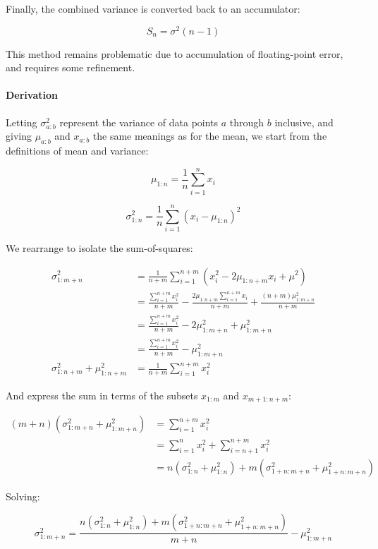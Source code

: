 \documentclass[a4paper]{article}
\begin{document}
Finally, the combined variance is converted back to an accumulator:

\[S_n = \sigma^2(n - 1)\]

This method remains problematic due to accumulation of floating-point
error, and requires some refinement.

\paragraph{Derivation}\label{derivation-1}

Letting \(\sigma_{a:b}^2\) represent the variance of data points \(a\)
through \(b\) inclusive, and giving \(\mu_{a:b}\) and \(x_{a:b}\) the
same meanings as for the mean, we start from the definitions of mean and
variance:

\[\mu_{1:n} = \frac{1}{n} \sum\limits_{i=1}^n x_i\]

\[\sigma_{1:n}^2 = \frac{1}{n} \sum\limits_{i=1}^n (x_i - \mu_{1:n})^2\]

We rearrange to isolate the sum-of-squares:

\[\begin{aligned}\sigma_{1:m+n}^2 &= \frac{1}{n+m} \sum\limits_{i=1}^{n+m} (x_i^2 - 2\mu_{1:n+m}x_i + \mu^2) \\
  &= \frac{\sum\limits_{i=1}^{n+m} x_i^2}{n+m} - \frac{2\mu_{1:n+m}\sum\limits_{i=1}^{n+m} x_i}{n+m} + \frac{(n + m)\mu_{1:m+n}^2}{n+m} \\
  &= \frac{\sum\limits_{i=1}^{n+m} x_i^2}{n+m} - 2\mu_{1:m+n}^2 + \mu_{1:m+n}^2 \\
  &= \frac{\sum\limits_{i=1}^{n+m} x_i^2}{n+m} - \mu_{1:m+n}^2 \\
  \sigma_{1:n+m}^2 + \mu_{1:n+m}^2 &= \frac{1}{n+m} \sum\limits_{i=1}^{n+m} x_i^2\end{aligned}\]

And express the sum in terms of the subsets \(x_{1:m}\) and
\(x_{m+1:n+m}\):

\[\begin{aligned}(m + n)(\sigma_{1:m+n}^2 + \mu_{1:m+n}^2) &= \sum\limits_{i=1}^{n+m} x_i^2 \\
  &= \sum_{i=1}^n x_i^2 + \sum_{i=n+1}^{n+m} x_i^2 \\
  &= n(\sigma^2_{1:n} + \mu_{1:n}^2) + m(\sigma_{1+n:m+n}^2 + \mu_{1+n:m+n}^2)\end{aligned}\]

Solving:

\[\sigma_{1:m+n}^2 = \frac{n(\sigma_{1:n}^2 + \mu_{1:n}^2) + m(\sigma_{1+n:m+n}^2 + \mu_{1+n:m+n}^2)}{m+n} - \mu_{1:m+n}^2\]
\end{document}
